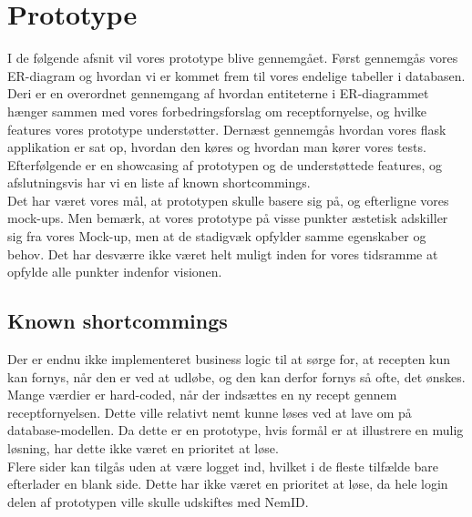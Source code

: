 \section{Prototype}
I de følgende afsnit vil vores prototype blive gennemgået. Først gennemgås vores ER-diagram og hvordan vi er kommet frem til vores endelige tabeller i databasen. Deri er en overordnet gennemgang af hvordan entiteterne i ER-diagrammet hænger sammen med vores forbedringsforslag om receptfornyelse, og hvilke features vores prototype understøtter. Dernæst gennemgås hvordan vores flask applikation er sat op, hvordan den køres og hvordan man kører vores tests. Efterfølgende er en showcasing af prototypen og de understøttede features, og afslutningsvis har vi en liste af known shortcommings.\\
Det har været vores mål, at prototypen skulle basere sig på, og efterligne vores mock-ups. Men bemærk, at vores prototype på visse punkter æstetisk adskiller sig fra vores Mock-up, men at de stadigvæk opfylder samme egenskaber og behov. Det har desværre ikke været helt muligt inden for vores tidsramme at opfylde alle punkter indenfor visionen. 







\subsection{Known shortcommings}
Der er endnu ikke implementeret business logic til at sørge for, at recepten kun kan fornys, når den er ved at udløbe, og den kan derfor fornys så ofte, det ønskes.\\
Mange værdier er hard-coded, når der indsættes en ny recept gennem receptfornyelsen. Dette ville relativt nemt kunne løses ved at lave om på database-modellen. Da dette er en prototype, hvis formål er at illustrere en mulig løsning, har dette ikke været en prioritet at løse.\\
Flere sider kan tilgås uden at være logget ind, hvilket i de fleste tilfælde bare efterlader en blank side. Dette har ikke været en prioritet at løse, da hele login delen af prototypen ville skulle udskiftes med NemID.\\

